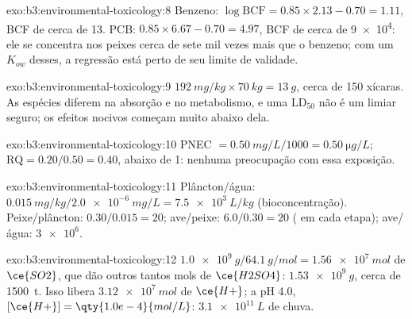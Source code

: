 \begin{solution}{exo:b3:environmental-toxicology:8}
Benzeno: $\log\mathrm{BCF} = 0.85 \times 2.13 - 0.70 = 1.11$, BCF de cerca de 13. PCB: $0.85 \times 6.67 - 0.70 = 4.97$, BCF de cerca de
\num{9e4}: ele se concentra nos peixes cerca de sete mil vezes mais que o benzeno; com um
$K_{ow}$ desses, a regressão está perto de seu limite de validade.
\end{solution}

\begin{solution}{exo:b3:environmental-toxicology:9}
$\qty{192}{mg/kg} \times \qty{70}{kg} = \qty{13}{g}$, cerca de 150 xícaras. As espécies diferem na absorção e no metabolismo,
e uma $\mathrm{LD_{50}}$ não é um limiar seguro; os efeitos nocivos começam muito abaixo dela.
\end{solution}

\begin{solution}{exo:b3:environmental-toxicology:10}
PNEC $= \qty{0.50}{mg/L}/1000 = \qty{0.50}{\micro g/L}$; $\mathrm{RQ} = 0.20/0.50 = 0.40$, abaixo de 1: nenhuma preocupação com essa exposição.
\end{solution}

\begin{solution}{exo:b3:environmental-toxicology:11}
Plâncton/água: $\qty{0.015}{mg/kg}/\qty{2.0e-6}{mg/L} = \qty{7.5e3}{L/kg}$ (bioconcentração). Peixe/plâncton: $0.30/0.015 = 20$;
ave/peixe: $6.0/0.30 = 20$ ( em cada etapa); ave/água: $\num{3e6}$.
\end{solution}

\begin{solution}{exo:b3:environmental-toxicology:12}
$\qty{1.0e9}{g}/\qty{64.1}{g/mol} = \qty{1.56e7}{mol}$ de $\ce{SO2}$, que dão outros tantos mols de $\ce{H2SO4}$: $\qty{1.53e9}{g}$, cerca de \qty{1500}{t}. Isso
libera $\qty{3.12e7}{mol}$ de $\ce{H+}$; a pH 4.0, $[\ce{H+}] = \qty{1.0e-4}{mol/L}$: $\qty{3.1e11}{L}$ de chuva.
\end{solution}

